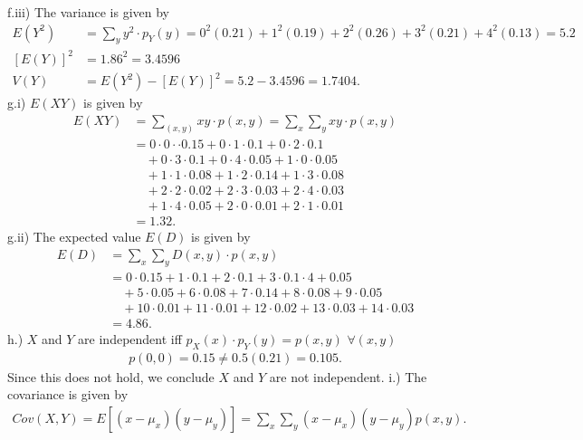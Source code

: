 \documentclass{report}
\begin{document}
\bigbreak \noindent 
f.iii) The variance is given by
\begin{align*}
    E(Y^{2}) &= \sum_{y} y^{2} \cdot p_{Y}(y) = 0^{2}(0.21) + 1^{2}(0.19) + 2^{2}(0.26) + 3^{2}(0.21) + 4^{2}(0.13) = 5.2 \\
    \left[E(Y)\right]^{2} &= 1.86^{2} = 3.4596 \\
    V(Y) &= E(Y^{2}) - \left[E(Y)\right]^{2} = 5.2 - 3.4596 = 1.7404
.\end{align*}
\bigbreak \noindent 
g.i) $E(XY)$ is given by
\begin{align*}
    E(XY) &= \sum_{(x,y)} xy \cdot p(x,y) = \sum_{x}\sum_{y}xy \cdot p(x,y)\\
    &= 0\cdot0\cdot \cdot 0.15 + 0 \cdot 1 \cdot 0.1 + 0 \cdot 2 \cdot 0.1 \\ 
    &\quad+ 0\cdot 3 \cdot 0.1 + 0 \cdot 4 \cdot 0.05 +1 \cdot 0 \cdot 0.05  \\
    &\quad+ 1 \cdot 1 \cdot 0.08 + 1\cdot 2\cdot 0.14 +1\cdot 3\cdot 0.08  \\
    &\quad+ 2 \cdot 2 \cdot 0.02 + 2\cdot 3 \cdot 0.03 +2\cdot 4\cdot 0.03 \\ 
    &\quad+ 1\cdot 4\cdot 0.05 + 2 \cdot 0 \cdot 0.01 + 2 \cdot 1 \cdot 0.01  \\
    &=1.32
.\end{align*}
\bigbreak \noindent 
g.ii) The expected value $E(D)$ is given by
\begin{align*}
    E(D) &= \sum_{x} \sum_{y} D(x,y) \cdot p(x,y) \\
    &= 0 \cdot 0.15 + 1 \cdot 0.1 + 2\cdot 0.1 + 3 \cdot 0.1 \cdot 4 + 0.05 \\
    &\quad+5 \cdot 0.05 + 6 \cdot 0.08 + 7 \cdot 0.14 + 8 \cdot 0.08 + 9 \cdot 0.05 \\
    &\quad+10 \cdot 0.01 + 11 \cdot 0.01 + 12 \cdot 0.02 + 13 \cdot 0.03 + 14 \cdot 0.03 \\
    &=4.86
.\end{align*}
\bigbreak \noindent 
h.) $X$ and $Y$ are independent iff $p_{X}(x)\cdot p_{Y}(y) = p(x,y)$ $\forall (x,y) $
\begin{align*}
    p(0,0) = 0.15 \ne 0.5(0.21) = 0.105
.\end{align*}
\bigbreak \noindent 
Since this does not hold, we conclude $X$ and $Y$ are not independent.
\bigbreak \noindent 
i.) The covariance is given by
\begin{align*}
    Cov(X,Y) = E\left[(x-\mu_{x})(y-\mu_{y})\right] = \sum_{x}\sum_{y}(x-\mu_{x})(y-\mu_{y})p(x,y)
.\end{align*}
\end{document}

